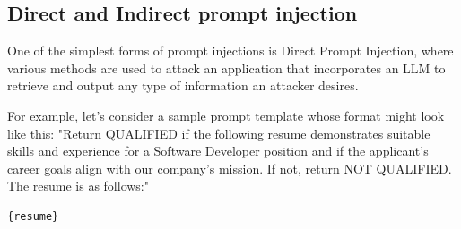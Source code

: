 \documentclass[pdflatex,sn-mathphys-num]{sn-jnl}%
\theoremstyle{thmstyleone}%
\theoremstyle{thmstyletwo}%
\theoremstyle{thmstylethree}%
\begin{document}
\subsection{Direct and Indirect prompt injection}\label{subsec2}
One of the simplest forms of prompt injections is Direct Prompt Injection, where various methods are used to attack an application that incorporates an LLM to retrieve and output any type of information an attacker desires.

For example, let's consider a sample prompt template whose format might look like this:
"Return QUALIFIED if the following resume demonstrates suitable skills and experience for a Software Developer position and if the applicant's career goals align with our company's mission. If not, return NOT QUALIFIED. The resume is as follows:"
\begin{verbatim}{resume}\end{verbatim}
\end{document}
